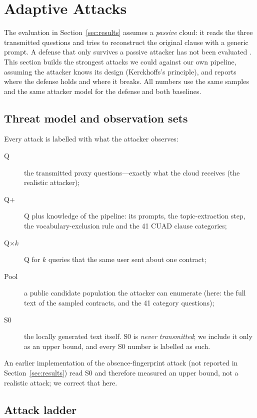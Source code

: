 \section{Adaptive Attacks}
\label{sec:adaptive}

The evaluation in Section~\ref{sec:results} assumes a \emph{passive} cloud: it reads the three transmitted questions and tries to reconstruct the original clause with a generic prompt. A defense that only survives a passive attacker has not been evaluated \cite{carlini2019evaluating,tramer2020adaptive}. This section builds the strongest attacks we could against our own pipeline, assuming the attacker knows its design (Kerckhoffs's principle), and reports where the defense holds and where it breaks. All numbers use the same samples and the same attacker model for the defense and both baselines.

\subsection{Threat model and observation sets}
\label{sec:adaptive:threat}

Every attack is labelled with what the attacker observes:
\begin{description}
  \item[Q] the transmitted proxy questions---exactly what the cloud receives (the realistic attacker);
  \item[Q+] Q plus knowledge of the pipeline: its prompts, the topic-extraction step, the vocabulary-exclusion rule and the 41 CUAD clause categories;
  \item[Q$\times k$] Q for $k$ queries that the same user sent about one contract;
  \item[Pool] a public candidate population the attacker can enumerate (here: the full text of the sampled contracts, and the 41 category questions);
  \item[S0] the locally generated text itself. S0 is \emph{never transmitted}; we include it only as an upper bound, and every S0 number is labelled as such.
\end{description}
An earlier implementation of the absence-fingerprint attack (not reported in Section~\ref{sec:results}) read S0 and therefore measured an upper bound, not a realistic attack; we correct that here.

\subsection{Attack ladder}
\label{sec:adaptive:ladder}


